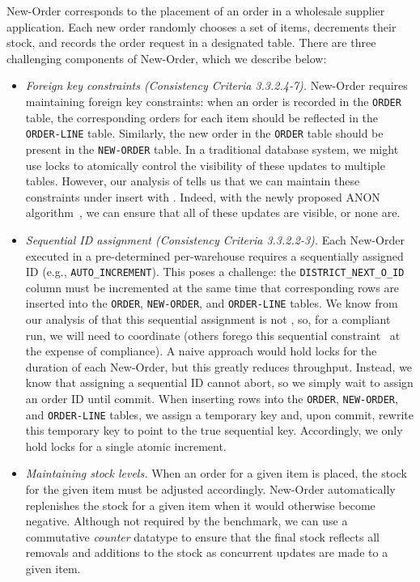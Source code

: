 New-Order corresponds to the placement of an order in a wholesale
supplier application. Each new order randomly chooses a set of items,
decrements their stock, and records the order request in a designated
table. There are three challenging components of New-Order, which we
describe below:
\begin{itemize}

\item \textit{Foreign key constraints (Consistency Criteria
  3.3.2.4-7).} New-Order requires maintaining foreign key constraints:
  when an order is recorded in the \texttt{ORDER} table, the
  corresponding orders for each item should be reflected in the
  \texttt{ORDER-LINE} table. Similarly, the new order in the
  \texttt{ORDER} table should be present in the \texttt{NEW-ORDER}
  table. In a traditional database system, we might use locks to
  atomically control the visibility of these updates to multiple
  tables. However, our analysis of \lang tells us that we can maintain
  these constraints under insert with \cfreedom. Indeed, with the
  newly proposed \cfree ANON algorithm~\cite{ramp-txns}, we can ensure
  that all of these updates are visible, or none are.

\item \textit{Sequential ID assignment (Consistency Criteria
  3.3.2.2-3).} Each New-Order executed in a pre-determined
  per-warehouse requires a sequentially assigned ID (e.g.,
  \texttt{AUTO\_INCREMENT}). This poses a challenge: the
  \texttt{DISTRICT\_NEXT\_O\_ID} column must be incremented at the
  same time that corresponding rows are inserted into the
  \texttt{ORDER}, \texttt{NEW-ORDER}, and \texttt{ORDER-LINE}
  tables. We know from our analysis of \lang that this sequential
  assignment is not \cfree, so, for a compliant run, we will need to
  coordinate (others forego this sequential
  constraint~\cite{hat-vldb,silo} at the expense of compliance). A
  naive approach would hold locks for the duration of each New-Order,
  but this greatly reduces throughput. Instead, we know that assigning
  a sequential ID cannot abort, so we simply wait to assign an order
  ID until commit. When inserting rows into the \texttt{ORDER},
  \texttt{NEW-ORDER}, and \texttt{ORDER-LINE} tables, we assign a
  temporary key and, upon commit, rewrite this temporary key to point
  to the true sequential key. Accordingly, we only hold locks for a
  single atomic increment.

\item \textit{Maintaining stock levels.} When an order for a given
  item is placed, the stock for the given item must be adjusted
  accordingly. New-Order automatically replenishes the stock for a
  given item when it would otherwise become negative. Although not
  required by the benchmark, we can use a commutative \textit{counter}
  datatype to ensure that the final stock reflects all removals and
  additions to the stock as concurrent updates are made to a given item.
\end{itemize}

